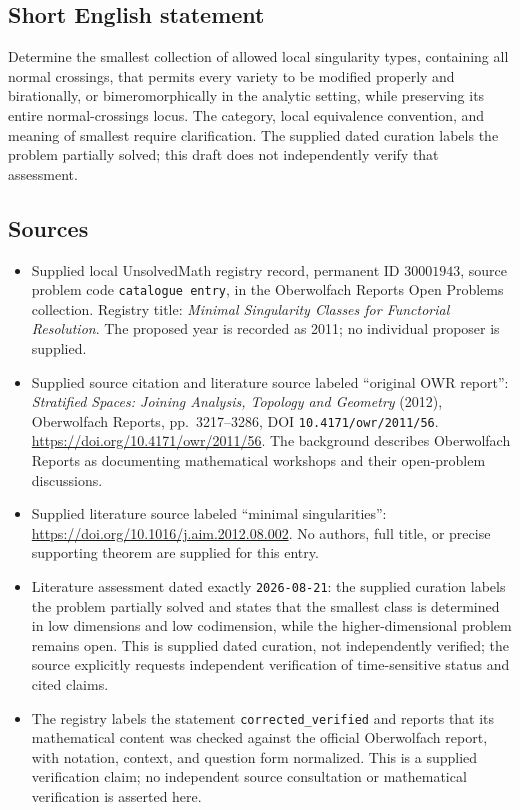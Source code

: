 \documentclass[11pt]{article}
\begin{document}
\subsection{Short English statement}
Determine the smallest collection of allowed local singularity types, containing all normal crossings, that permits every variety to be modified properly and birationally, or bimeromorphically in the analytic setting, while preserving its entire normal-crossings locus. The category, local equivalence convention, and meaning of smallest require clarification. The supplied dated curation labels the problem partially solved; this draft does not independently verify that assessment.
\subsection{Sources}
\begin{itemize}
\item Supplied local UnsolvedMath registry record, permanent ID \(30001943\), source problem code \texttt{catalogue entry}, in the Oberwolfach Reports Open Problems collection. Registry title: \emph{Minimal Singularity Classes for Functorial Resolution}. The proposed year is recorded as 2011; no individual proposer is supplied.
\item Supplied source citation and literature source labeled ``original OWR report'': \emph{Stratified Spaces: Joining Analysis, Topology and Geometry} (2012), Oberwolfach Reports, pp.\ 3217--3286, DOI \texttt{10.4171/owr/2011/56}. \url{https://doi.org/10.4171/owr/2011/56}. The background describes Oberwolfach Reports as documenting mathematical workshops and their open-problem discussions.
\item Supplied literature source labeled ``minimal singularities'': \url{https://doi.org/10.1016/j.aim.2012.08.002}. No authors, full title, or precise supporting theorem are supplied for this entry.
\item Literature assessment dated exactly \texttt{2026-08-21}: the supplied curation labels the problem partially solved and states that the smallest class is determined in low dimensions and low codimension, while the higher-dimensional problem remains open. This is supplied dated curation, not independently verified; the source explicitly requests independent verification of time-sensitive status and cited claims.
\item The registry labels the statement \texttt{corrected\_verified} and reports that its mathematical content was checked against the official Oberwolfach report, with notation, context, and question form normalized. This is a supplied verification claim; no independent source consultation or mathematical verification is asserted here.
\end{itemize}
\end{document}
